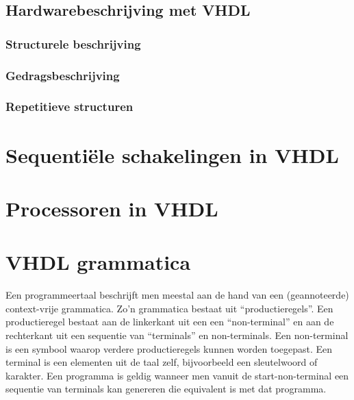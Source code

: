 \subsection{Hardwarebeschrijving met VHDL}

\subsubsection{Structurele beschrijving}

\subsubsection{Gedragsbeschrijving}

\subsubsection{Repetitieve structuren}

\section{Sequenti\"ele schakelingen in VHDL}

\section{Processoren in VHDL}

\section{VHDL grammatica}
Een programmeertaal beschrijft men meestal aan de hand van een (geannoteerde) context-vrije grammatica. Zo'n grammatica bestaat uit ``productieregels''. Een productieregel bestaat aan de linkerkant uit een een ``non-terminal'' en aan de rechterkant uit een sequentie van ``terminals'' en non-terminals. Een non-terminal is een symbool waarop verdere productieregels kunnen worden toegepast. Een terminal is een elementen uit de taal zelf, bijvoorbeeld een sleutelwoord of karakter. Een programma is geldig wanneer men vanuit de start-non-terminal een sequentie van terminals kan genereren die equivalent is met dat programma.

